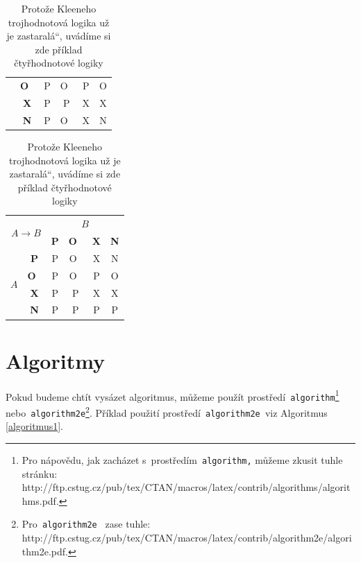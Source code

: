 \documentclass[a4paper,11pt]{article}
\newcommand{\myuv}[1]{\quotedblbase#1\textquotedblleft}
\begin{document}
\begin{table}[h]
\begin{center}
\begin{tabular}{|c|c|c|c|c|c|}
\cline{2-6}
\multicolumn{1}{|c|}{} & \bfseries O~& P & O~& P & O\\
\cline{2-6}
\multicolumn{1}{|c|}{} & \bfseries X & P & P & X & X\\
\cline{2-6}
\multicolumn{1}{|c|}{} & \bfseries N & P & O~& X & N\\
\hline
\end{tabular}
\begin{tabular}{|c|c|c|c|c|c|}
\hline
\multicolumn{2}{|c|}{\multirow{2}{*}{$A \rightarrow B$}} & \multicolumn{4}{|c|}{$B$}\\ \cline{3-6}
\multicolumn{2}{|c|}{} & \bfseries P & \bfseries O~& \bfseries X & \bfseries N\\
\hline
\multicolumn{1}{|c|}{\multirow{4}{*}{$A$}} & \bfseries P & P & O~& X & N\\
\cline{2-6}
\multicolumn{1}{|c|}{} & \bfseries O~& P & O~& P & O\\
\cline{2-6}
\multicolumn{1}{|c|}{} & \bfseries X & P & P & X & X\\
\cline{2-6}
\multicolumn{1}{|c|}{} & \bfseries N & P & P & P & P\\
\hline
\end{tabular}
\caption{Protože Kleeneho trojhodnotová logika už je \myuv{zastaralá}, uvádíme si zde příklad čtyřhodnotové logiky}
\label{tab2}
\end{center}
\end{table}

\section{Algoritmy}\label{sekce3}
Pokud budeme chtít vysázet algoritmus, můžeme použít prostředí\texttt{ algorithm}\footnote{Pro nápovědu, jak zacházet s~prostředím\texttt{ algorithm,} můžeme zkusit tuhle stránku:\\
http://ftp.cstug.cz/pub/tex/CTAN/macros/latex/contrib/algorithms/algorithms.pdf.} nebo\texttt{ algorithm2e}\footnote{Pro\texttt{ algorithm2e } zase tuhle: http://ftp.cstug.cz/pub/tex/CTAN/macros/latex/contrib/algorithm2e/algorithm2e.pdf.}.
Příklad použití prostředí\texttt{ algorithm2e }viz Algoritmus \ref{algoritmus1}. 
\vspace{2em}
\end{document}
